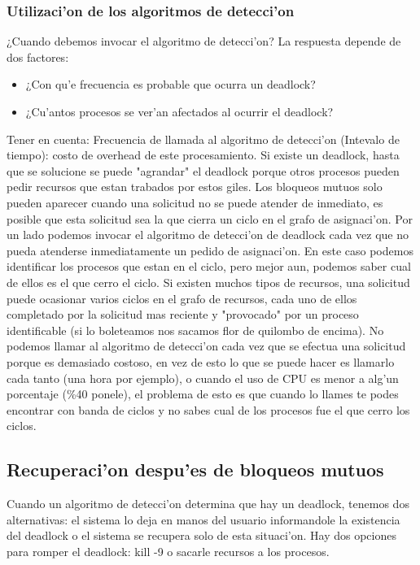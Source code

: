 \subsubsection{Utilizaci'on de los algoritmos de detecci'on}
¿Cuando debemos invocar el algoritmo de detecci'on? La respuesta depende de dos factores:
\begin{itemize}
 \item ¿Con qu'e frecuencia es probable que ocurra un deadlock?
 \item ¿Cu'antos procesos se ver'an afectados al ocurrir el deadlock?
\end{itemize}
Tener en cuenta:
Frecuencia de llamada al algoritmo de detecci'on (Intevalo de tiempo): costo de overhead de este procesamiento.
Si existe un deadlock, hasta que se solucione se puede "agrandar" el deadlock porque otros procesos pueden pedir recursos que estan trabados por estos giles.
Los bloqueos mutuos solo pueden aparecer cuando una solicitud no se puede atender de inmediato, es posible que esta solicitud sea la que cierra un ciclo en el grafo de asignaci'on. Por un lado podemos invocar el algoritmo de detecci'on de deadlock cada vez que no pueda atenderse inmediatamente un pedido de asignaci'on. En este caso podemos identificar los procesos que estan en el ciclo, pero mejor aun, podemos saber cual de ellos es el que cerro el ciclo. Si existen muchos tipos de recursos, una solicitud puede ocasionar varios ciclos en el grafo de recursos, cada uno de ellos completado por la solicitud mas reciente y "provocado" por un proceso identificable (si lo boleteamos nos sacamos flor de quilombo de encima).
No podemos llamar al algoritmo de detecci'on cada vez que se efectua una solicitud porque es demasiado costoso, en vez de esto lo que se puede hacer es llamarlo cada tanto (una hora por ejemplo), o cuando el uso de CPU es menor a alg'un porcentaje (\%40 ponele), el problema de esto es que cuando lo llames te podes encontrar con banda de ciclos y no sabes cual de los procesos fue el que cerro los ciclos.
 
\subsection{Recuperaci'on despu'es de bloqueos mutuos}
Cuando un algoritmo de detecci'on determina que hay un deadlock, tenemos dos alternativas: el sistema lo deja en manos del usuario informandole la existencia del deadlock o el sistema se recupera solo de esta situaci'on.
Hay dos opciones para romper el deadlock: kill -9 o sacarle recursos a los procesos.

